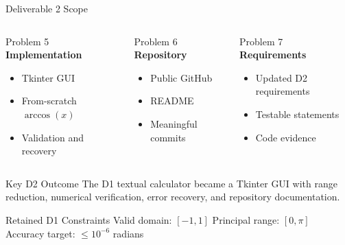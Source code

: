\documentclass[aspectratio=169]{beamer}
\begin{document}
\begin{frame}{Deliverable 2 Scope}
\small

\begin{columns}[T,onlytextwidth]

\begin{block}{Problem 5}
\centering
\textbf{Implementation}

\vspace{0.05cm}

\begin{itemize}
    \item Tkinter GUI
    \item From-scratch \(\arccos(x)\)
    \item Validation and recovery
\end{itemize}
\end{block}

\begin{block}{Problem 6}
\centering
\textbf{Repository}

\vspace{0.05cm}

\begin{itemize}
    \item Public GitHub
    \item README
    \item Meaningful commits
\end{itemize}
\end{block}

\begin{block}{Problem 7}
\centering
\textbf{Requirements}

\vspace{0.05cm}

\begin{itemize}
    \item Updated D2 requirements
    \item Testable statements
    \item Code evidence
\end{itemize}
\end{block}

\end{columns}

\vspace{0.08cm}

\begin{exampleblock}{Key D2 Outcome}
The D1 textual calculator became a Tkinter GUI with range reduction,
numerical verification, error recovery, and repository documentation.
\end{exampleblock}

\vspace{-0.05cm}

\begin{block}{Retained D1 Constraints}
Valid domain: \([-1,1]\) \quad
Principal range: \([0,\pi]\) \quad
Accuracy target: \(\leq 10^{-6}\) radians
\scriptsize\cite{project}
\end{block}


\end{frame}
\end{document}

